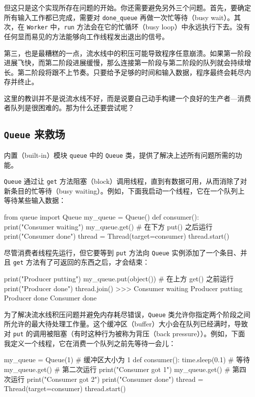 但这只是这个实现所存在问题的开始。你还需要避免另外三个问题。首先，要确定所有输入工作都已完成，需要对 \texttt{done\_queue} 再做一次忙等待（busy wait）。其次，在 \texttt{Worker} 中，\texttt{run} 方法会在它的忙循环（busy loop）中永远执行下去。没有任何显而易见的方法能够向工作线程发出退出的信号。

第三，也是最糟糕的一点，流水线中的积压可能导致程序任意崩溃。如果第一阶段进展飞快，而第二阶段进展缓慢，那么连接第一阶段与第二阶段的队列就会持续增长。第二阶段将跟不上节奏。只要给予足够的时间和输入数据，程序最终会耗尽内存并终止。

这里的教训并不是说流水线不好，而是说要自己动手构建一个良好的生产者—消费者队列是很困难的。那为什么还要尝试呢？

\subsection{\texttt{Queue} 来救场}

内置（built-in）模块 \texttt{queue} 中的 \texttt{Queue} 类，提供了解决上述所有问题所需的功能。

\texttt{Queue} 通过让 \texttt{get} 方法阻塞（block）调用线程，直到有数据可用，从而消除了对新条目的忙等待（busy waiting）。例如，下面我启动一个线程，它在一个队列上等待某些输入数据：

\begin{codebox}[python]
from queue import Queue
my_queue = Queue()
def consumer():
    print("Consumer waiting")
    my_queue.get()  # 在下方 put() 之后运行
    print("Consumer done")
thread = Thread(target=consumer)
thread.start()
\end{codebox}

尽管消费者线程先运行，但它要等到 \texttt{put} 方法向 \texttt{Queue} 实例添加了一个条目、并且 \texttt{get} 方法有了可返回的东西之后，才会结束：

\begin{codebox}[python]
print("Producer putting")
my_queue.put(object())  # 在上方 get() 之前运行
print("Producer done")
thread.join()
>>>
Consumer waiting
Producer putting
Producer done
Consumer done
\end{codebox}

为了解决流水线积压问题并避免内存耗尽错误，\texttt{Queue} 类允许你指定两个阶段之间所允许的最大待处理工作量。这个缓冲区（buffer）大小会在队列已经满时，导致对 \texttt{put} 的调用被阻塞（有时这种行为被称为背压（back pressure））。例如，下面我定义一个线程，它在消费一个队列之前先等待一会儿：

\begin{codebox}[python]
my_queue = Queue(1)  # 缓冲区大小为 1
def consumer():
    time.sleep(0.1)  # 等待
    my_queue.get()   # 第二次运行
    print("Consumer got 1")
    my_queue.get()   # 第四次运行
    print("Consumer got 2")
    print("Consumer done")
thread = Thread(target=consumer)
thread.start()
\end{codebox}

